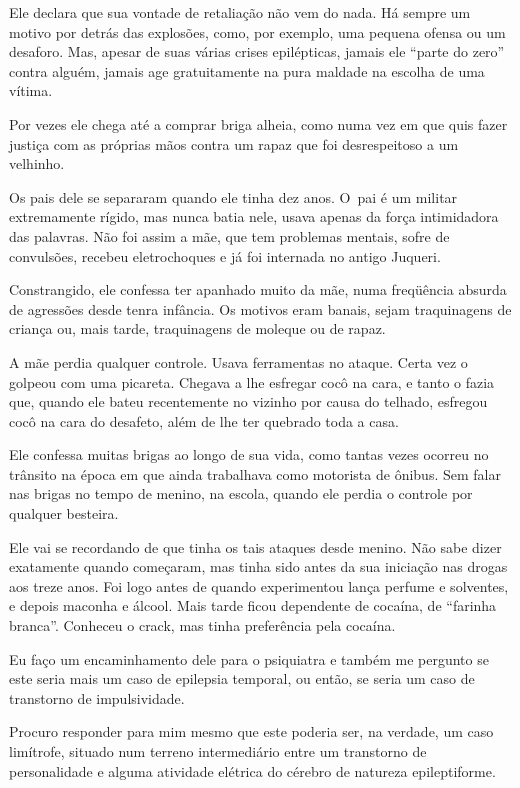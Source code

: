Ele declara que sua vontade de retaliação não vem do nada. Há sempre um
motivo por detrás das explosões, como, por exemplo, uma pequena ofensa
ou um desaforo. Mas, apesar de suas várias crises epilépticas, jamais
ele ``parte do zero'' contra alguém, jamais age gratuitamente na pura
maldade na escolha de uma vítima.

Por vezes ele chega até a comprar briga alheia, como numa vez em que
quis fazer justiça com as próprias mãos contra um rapaz que foi
desrespeitoso a um velhinho.

\asterisc{}

Os pais dele se separaram quando ele tinha dez anos. O~pai é um militar
extremamente rígido, mas nunca batia nele, usava apenas da força
intimidadora das palavras. Não foi assim a mãe, que tem problemas
mentais, sofre de convulsões, recebeu eletrochoques e já foi internada
no antigo Juqueri.

Constrangido, ele confessa ter apanhado muito da mãe, numa freqüência
absurda de agressões desde tenra infância. Os motivos eram banais, sejam
traquinagens de criança ou, mais tarde, traquinagens de moleque ou de
rapaz.

A mãe perdia qualquer controle. Usava ferramentas no ataque. Certa vez o
golpeou com uma picareta. Chegava a lhe esfregar cocô na cara, e tanto o
fazia que, quando ele bateu recentemente no vizinho por causa do
telhado, esfregou cocô na cara do desafeto, além de lhe ter quebrado
toda a casa.

Ele confessa muitas brigas ao longo de sua vida, como tantas vezes
ocorreu no trânsito na época em que ainda trabalhava como motorista de
ônibus. Sem falar nas brigas no tempo de menino, na escola, quando ele
perdia o controle por qualquer besteira.

Ele vai se recordando de que tinha os tais ataques desde menino. Não
sabe dizer exatamente quando começaram, mas tinha sido antes da sua
iniciação nas drogas aos treze anos. Foi logo antes de quando
experimentou lança perfume e solventes, e depois maconha e álcool. Mais
tarde ficou dependente de cocaína, de ``farinha branca''. Conheceu o
crack, mas tinha preferência pela cocaína.

Eu faço um encaminhamento dele para o psiquiatra e também me pergunto se
este seria mais um caso de epilepsia temporal, ou então, se seria um
caso de transtorno de impulsividade.

Procuro responder para mim mesmo que este poderia ser, na verdade, um
caso limítrofe, situado num terreno intermediário entre um transtorno de
personalidade e alguma atividade elétrica do cérebro de natureza
epileptiforme.

